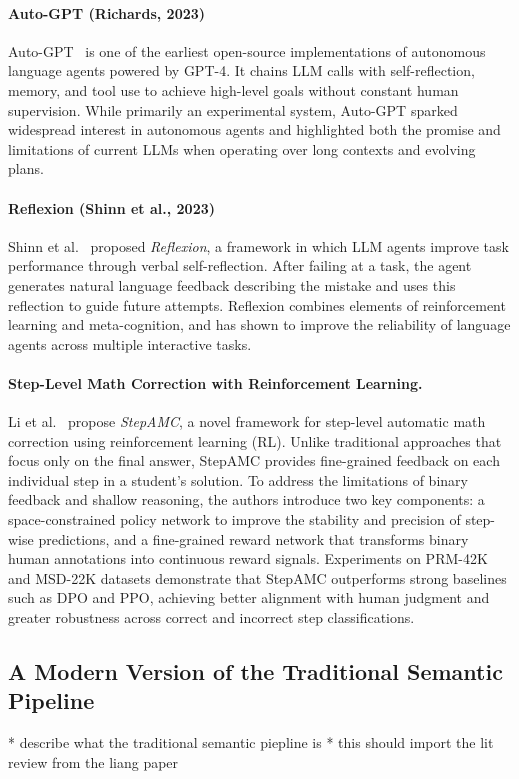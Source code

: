 \paragraph{Auto-GPT (Richards, 2023)}  
Auto-GPT~\cite{torantulino2023autogpt} is one of the earliest open-source implementations of autonomous language agents powered by GPT-4. It chains LLM calls with self-reflection, memory, and tool use to achieve high-level goals without constant human supervision. While primarily an experimental system, Auto-GPT sparked widespread interest in autonomous agents and highlighted both the promise and limitations of current LLMs when operating over long contexts and evolving plans.

\paragraph{Reflexion (Shinn et al., 2023)}  
Shinn et al.~\cite{shinn2023reflexion} proposed \emph{Reflexion}, a framework in which LLM agents improve task performance through verbal self-reflection. After failing at a task, the agent generates natural language feedback describing the mistake and uses this reflection to guide future attempts. Reflexion combines elements of reinforcement learning and meta-cognition, and has shown to improve the reliability of language agents across multiple interactive tasks.

\paragraph{Step-Level Math Correction with Reinforcement Learning.}
Li et al.~\cite{li2025stepamc} propose \textit{StepAMC}, a novel framework for step-level automatic math correction using reinforcement learning (RL). Unlike traditional approaches that focus only on the final answer, StepAMC provides fine-grained feedback on each individual step in a student's solution. To address the limitations of binary feedback and shallow reasoning, the authors introduce two key components: a space-constrained policy network to improve the stability and precision of step-wise predictions, and a fine-grained reward network that transforms binary human annotations into continuous reward signals. Experiments on PRM-42K and MSD-22K datasets demonstrate that StepAMC outperforms strong baselines such as DPO and PPO, achieving better alignment with human judgment and greater robustness across correct and incorrect step classifications.


\subsection{A Modern Version of the Traditional Semantic Pipeline}
* describe what the traditional semantic piepline is
* this should import the lit review from the liang paper
